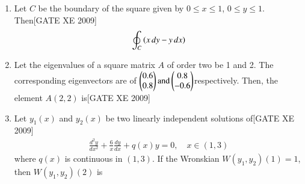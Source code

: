 \documentclass[journal,12pt,onecolumn]{IEEEtran}
\theoremstyle{remark}
\begin{document}
\begin{enumerate}
    \item Let $C$ be the boundary of the square given by $0 \leq x \leq 1$, $0 \leq y \leq 1$. Then\hfill[GATE XE 2009]
    \begin{align*}
 \oint_C \left(x\,dy - y\,dx\right)
    \end{align*}
    
    \begin{enumerate}
   \end{enumerate}    

    \item Let the eigenvalues of a square matrix $A$ of order two be 1 and 2. The corresponding eigenvectors are of $
        \begin{pmatrix} 0.6 \\ 0.8\end{pmatrix}  \text{and}  \begin{pmatrix} 0.8 \\ -0.6 \end{pmatrix}
$respectively. Then, the element $A(2,2)$ is\hfill[GATE XE 2009]\\
    \begin{enumerate}
  \end{enumerate}      
    
    \item Let $y_1(x)$ and $y_2(x)$ be two linearly independent solutions of\hfill[GATE XE 2009]
    \begin{align*}
        \frac{d^2 y}{dx^2} + \frac{6}{x}\frac{dy}{dx} + q(x)y = 0, \quad x \in (1,3)
   \end{align*}
    where $q(x)$ is continuous in $(1,3)$. If the Wronskian $W(y_1,y_2)(1) = 1$, then $W(y_1,y_2)(2)$ is\\
     \begin{enumerate}
\end{enumerate}      
  

\end{enumerate}
\end{document}
